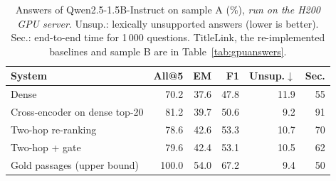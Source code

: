 \begin{table}[t]
\centering
\small
\caption{Answers of Qwen2.5-1.5B-Instruct on sample A (\%), \emph{run on the H200 GPU server}. Unsup.: lexically unsupported answers (lower is better). Sec.: end-to-end time for 1\,000 questions. TitleLink, the re-implemented baselines and sample B are in Table~\ref{tab:gpuanswers}.}
\label{tab:answers}
\begin{tabular}{lrrrrr}
\toprule
System & All@5 & EM & F1 & Unsup.$\downarrow$ & Sec. \\
\midrule
Dense & 70.2 & 37.6 & 47.8 & 11.9 & 55 \\
Cross-encoder on dense top-20 & 81.2 & 39.7 & 50.6 & 9.2 & 91 \\
Two-hop re-ranking & 78.6 & 42.6 & 53.3 & 10.7 & 70 \\
Two-hop + gate & 79.6 & 42.4 & 53.1 & 10.5 & 62 \\
Gold passages (upper bound) & 100.0 & 54.0 & 67.2 & 9.4 & 50 \\
\bottomrule
\end{tabular}
\end{table}
